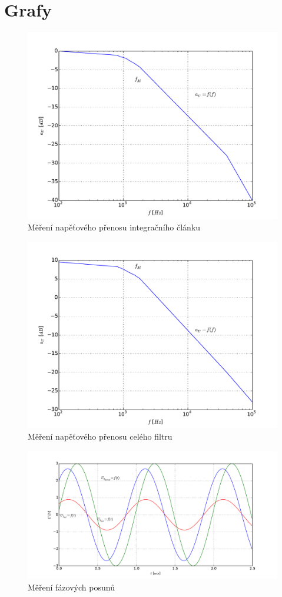 \section*{Grafy}
\setcounter{figure}{0}
\renewcommand{\figurename}{Graf č.}
  
  \begin{figure}[H]
    \centering
    \includegraphics[width=16cm]{../img/g1.pdf}
    \caption{Měření napěťového přenosu integračního článku}
    \label{gra:1}
  \end{figure}
  
  \begin{figure}[H]
    \centering
    \includegraphics[width=16cm]{../img/g2.pdf}
    \caption{Měření napěťového přenosu celého filtru}
    \label{gra:2}
  \end{figure}
  
  \begin{figure}[H]
    \centering
    \includegraphics[width=16cm]{../img/g3.pdf}
    \caption{Měření fázových posunů}
    \label{gra:3}
  \end{figure}

 
